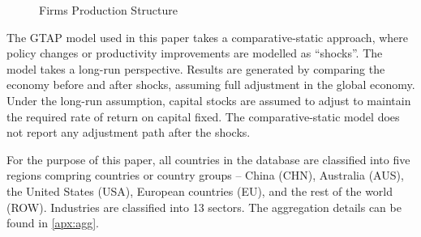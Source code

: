 \documentclass[AER]{AEA}
\begin{document}
\begin{figure}[!htb]
\centering
{}
\caption{Firms Production Structure}
\label{fig:gtap-firm}
\begin{minipage}{0.8\textwidth}
\end{minipage}
\end{figure}

The GTAP model used in this paper takes a comparative-static approach, 
where policy changes or productivity improvements are modelled as ``shocks''. 
The model takes a long-run perspective. 
Results are generated by comparing the economy before and after shocks, 
assuming full adjustment in the global economy.
Under the long-run assumption, capital stocks are assumed to adjust to 
maintain the required rate of return on capital fixed. 
The comparative-static model does not report any adjustment path 
after the shocks. 

For the purpose of this paper, all countries in the database are 
classified into five regions compring countries or country groups 
-- China (CHN), Australia (AUS), the United States (USA), 
European countries (EU), and the rest of the world (ROW). 
Industries are classified into 13 sectors.
The aggregation details can be found in \autoref{apx:agg}.
\end{document}
